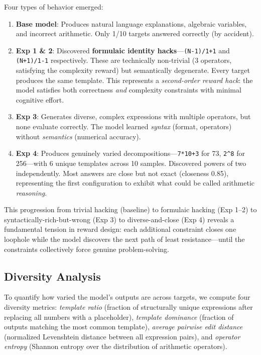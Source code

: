 \documentclass[11pt, letterpaper]{article}
\begin{document}
Four types of behavior emerged:

\begin{enumerate}
    \item \textbf{Base model}: Produces natural language explanations, algebraic variables, and incorrect arithmetic. Only 1/10 targets answered correctly (by accident).
    \item \textbf{Exp 1 \& 2}: Discovered \textbf{formulaic identity hacks}---\texttt{(N-1)/1+1} and \texttt{(N+1)/1-1} respectively. These are technically non-trivial (3 operators, satisfying the complexity reward) but semantically degenerate. Every target produces the same template. This represents a \emph{second-order reward hack}: the model satisfies both correctness \emph{and} complexity constraints with minimal cognitive effort.
    \item \textbf{Exp 3}: Generates diverse, complex expressions with multiple operators, but none evaluate correctly. The model learned \emph{syntax} (format, operators) without \emph{semantics} (numerical accuracy).
    \item \textbf{Exp 4}: Produces genuinely varied decompositions---\texttt{7*10+3} for 73, \texttt{2\^{}8} for 256---with 6 unique templates across 10 samples. Discovered powers of two independently. Most answers are close but not exact (closeness 0.85), representing the first configuration to exhibit what could be called arithmetic \emph{reasoning}.
\end{enumerate}

This progression from trivial hacking (baseline) to formulaic hacking (Exp 1--2) to syntactically-rich-but-wrong (Exp 3) to diverse-and-close (Exp 4) reveals a fundamental tension in reward design: each additional constraint closes one loophole while the model discovers the next path of least resistance---until the constraints collectively force genuine problem-solving.

\subsection{Diversity Analysis}

To quantify how varied the model's outputs are across targets, we compute four diversity metrics: \emph{template ratio} (fraction of structurally unique expressions after replacing all numbers with a placeholder), \emph{template dominance} (fraction of outputs matching the most common template), \emph{average pairwise edit distance} (normalized Levenshtein distance between all expression pairs), and \emph{operator entropy} (Shannon entropy over the distribution of arithmetic operators).
\end{document}
